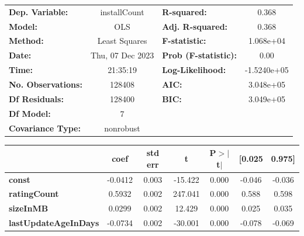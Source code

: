 \begin{table}
    \centering
    \begin{center}
        \begin{tabular}{lclc}
        \toprule
        \textbf{Dep. Variable:}       &   installCount   & \textbf{  R-squared:         } &      0.368   \\
        \textbf{Model:}               &       OLS        & \textbf{  Adj. R-squared:    } &      0.368   \\
        \textbf{Method:}              &  Least Squares   & \textbf{  F-statistic:       } &  1.068e+04   \\
        \textbf{Date:}                & Thu, 07 Dec 2023 & \textbf{  Prob (F-statistic):} &      0.00    \\
        \textbf{Time:}                &     21:35:19     & \textbf{  Log-Likelihood:    } & -1.5240e+05  \\
        \textbf{No. Observations:}    &      128408      & \textbf{  AIC:               } &  3.048e+05   \\
        \textbf{Df Residuals:}        &      128400      & \textbf{  BIC:               } &  3.049e+05   \\
        \textbf{Df Model:}            &           7      & \textbf{                     } &              \\
        \textbf{Covariance Type:}     &    nonrobust     & \textbf{                     } &              \\
        \bottomrule
        \end{tabular}
        \begin{tabular}{lcccccc}
                                      & \textbf{coef} & \textbf{std err} & \textbf{t} & \textbf{P$> |$t$|$} & \textbf{[0.025} & \textbf{0.975]}  \\
        \midrule
        \textbf{const}                &      -0.0412  &        0.003     &   -15.422  &         0.000        &       -0.046    &       -0.036     \\
        \textbf{ratingCount}          &       0.5932  &        0.002     &   247.041  &         0.000        &        0.588    &        0.598     \\
        \textbf{sizeInMB}             &       0.0299  &        0.002     &    12.429  &         0.000        &        0.025    &        0.035     \\
        \textbf{lastUpdateAgeInDays}  &      -0.0734  &        0.002     &   -30.001  &         0.000        &       -0.078    &       -0.069     \\

\end{tabular}
\end{center}
\end{table}
